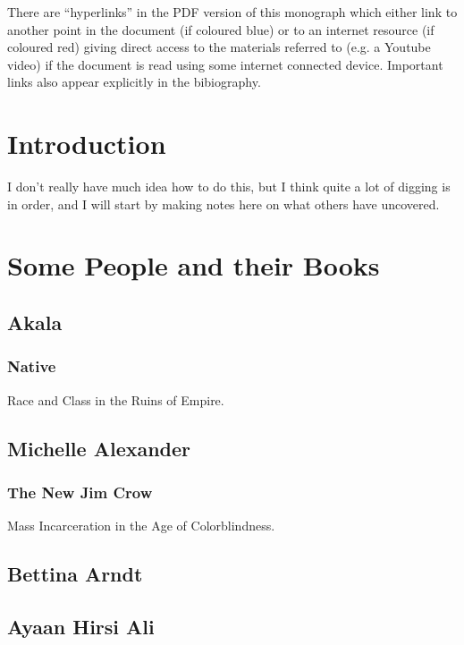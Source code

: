 \documentclass[10pt,titlepage]{book}
\begin{document}

There are ``hyperlinks'' in the PDF version of this monograph which either link to another point in the document  (if coloured blue) or to an internet resource  (if coloured red) giving direct access to the materials referred to (e.g. a Youtube video) if the document is read using some internet connected device.
Important links also appear explicitly in the bibiography.

\chapter{Introduction}

I don't really have much idea how to do this, but I think quite a lot of digging is in order, and I will start by making notes here on what others have uncovered.

\chapter{Some People and their Books}

\section{Akala}

\subsection{Native\cite{akala-native}}

Race and Class in the Ruins of Empire.

\section{Michelle Alexander}\label{AlexanderMichelle}

\subsection{The New Jim Crow\cite{alexander-tnjc}}
Mass Incarceration in the Age of Colorblindness.

\section{Bettina Arndt \cite{arndt-home}}\label{ArndtBettina}

\section{Ayaan Hirsi Ali}
\end{document}
